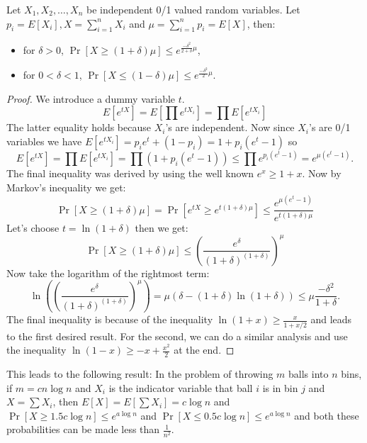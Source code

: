 
\begin{theorem}
Let $X_1, X_2, \ldots, X_n$ be independent 0/1 valued random variables. Let $p_i = E[X_i], X = \sum_{i=1}^n X_i$ and $\mu = \sum_{i=1}^n p_i = E[X]$, then:
\begin{itemize}
\item for $\delta > 0$, $\Pr[X \geq (1+ \delta) \mu] \leq e^{\frac{-\delta^2}{2+\delta} \mu}$,
\item for $0 < \delta < 1$, $\Pr[X \leq (1- \delta) \mu] \leq e^{\frac{-\delta^2}{2}\mu}.$
\end{itemize}
\end{theorem}
\begin{proof}
We introduce a dummy variable $t$. 
$$E\left[e^{tX}\right] = E\left[\prod e^{tX_i}\right] = \prod E\left[ e^{tX_i} \right]$$
The latter equality holds because $X_i$'s are independent. Now since $X_i$'s are 0/1 variables we have $E\left[e^{tX_i}\right] = p_i e^t + (1- p_i) = 1 + p_i (e^t -1 )$ so
$$
E\left[ e^{tX} \right] =  \prod E\left[ e^{tX_i} \right] = \prod \left(1 + p_i (e^t -1)\right)
\leq \prod e^{p_i (e^t - 1)} = e^{\mu (e^t - 1)}.$$
The final inequality was derived by using the well known $e^x \geq 1+x$. Now by Markov's inequality we get:
$$\Pr[X \geq (1 + \delta) \mu] = \Pr[e^{tX} \geq e^{t (1+ \delta) \mu}] \leq \frac{e^{\mu (e^t -1)}}{e^{t (1+\delta) \mu}}$$
Let's choose $t = \ln (1+ \delta)$ then we get:
$$
\Pr[X \geq (1+ \delta) \mu] \leq \left(\frac{e^{\delta}}{(1+\delta)^{(1+\delta)}}\right)^\mu
$$
Now take the logarithm of the rightmost term:
$$
\ln \left(\left(\frac{e^{\delta}}{(1+\delta)^{(1+\delta)}}\right)^\mu\right) = \mu (\delta - (1+\delta) \ln (1+\delta)) \leq \mu \frac{-\delta^2}{1+\delta}.
$$
The final inequality is because of the inequality $\ln (1+x) \geq \frac{x}{1+ x/2}$ and leads to the first desired result. For the second, we can do a similar analysis and use the inequality $\ln (1-x) \geq -x + \frac{x^2}{2}$ at the end.
\end{proof}

This leads to the following result:
In the problem of throwing $m$ balls into $n$ bins, if $m = c n \log n$ and $X_i$ is the indicator variable that ball $i$ is in bin $j$ and $X = \sum X_i$, then $E[X] = E\left[\sum X_i \right] = c \log n$ and $\Pr[X \geq 1.5 c \log n] \leq e^{a \log n}$ and $\Pr[X \leq 0.5 c \log n] \leq e^{a \log n}$ and both these probabilities can be made less than $\frac{1}{n^2}$. 

